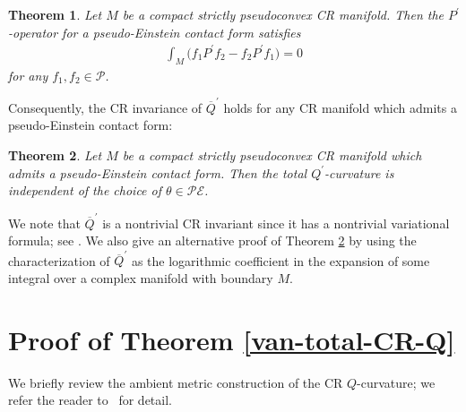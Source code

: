 \documentclass[pdftex]{sigma}
\numberwithin{equation}{section}
\newtheorem{Theorem}{Theorem}[section]
\begin{document}
\begin{Theorem}\label{self-adjoint} Let $M$ be a compact strictly pseudoconvex CR manifold. Then the $P^\prime$-operator for a pseudo-Einstein contact form satisfies
\begin{gather*}
\int_M \big(f_1P^\prime f_2-f_2 P^\prime f_1\big)=0
\end{gather*}
for any $f_1, f_2\in\mathcal{P}$.
\end{Theorem}
Consequently, the CR invariance of $\overline{Q}^\prime$ holds for any CR manifold which admits a pseudo-Einstein contact form:
\begin{Theorem}\label{CR-invariance}
Let $M$ be a compact strictly pseudoconvex CR manifold which admits a pseudo-Einstein contact form. Then the total $Q^\prime$-curvature is independent of the choice of $\theta\in\mathcal{PE}$.
\end{Theorem}

We note that $\overline{Q}^\prime$ is a nontrivial CR invariant since it has a nontrivial variational formula; see \cite{Hirachi/Marugame/Matsumoto}. We also give an alternative proof of Theorem \ref{CR-invariance} by using the characterization \cite[Theorem~5.6]{Hirachi} of
$\overline{Q}^\prime$ as the logarithmic coef\/f\/icient in the expansion of some integral over a complex manifold with boundary $M$.

\section{Proof of Theorem \ref{van-total-CR-Q}}
We brief\/ly review the ambient metric construction of the CR $Q$-curvature; we refer the reader to~\cite{Fefferman/Hirachi, Hirachi, Hirachi/Marugame/Matsumoto} for detail.
\end{document}
